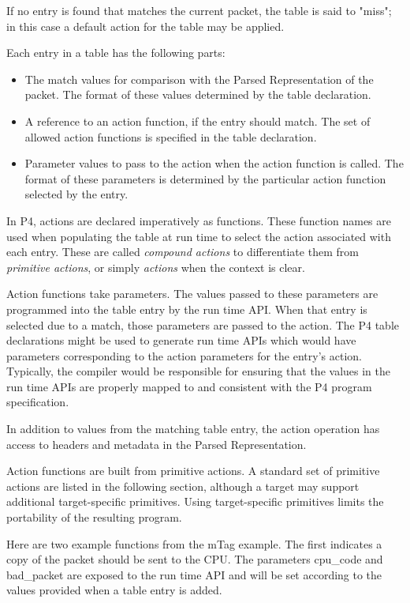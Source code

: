 \documentclass[12pt]{article}
\begin{document}
If no entry is found that matches the current packet, the table is said to 
"miss"; in this case a default action for the table may be applied.

Each entry in a \matchaction table has the following parts: 

\begin{itemize}
\item
The match values for comparison with the Parsed Representation of the packet. 
The format of these values determined by the table declaration.
\item
A reference to an action function, if the entry should match. The set
of allowed action functions is specified in the table declaration.
\item
Parameter values to pass to the action when the action function is called. 
The format of these parameters is determined by the particular action function 
selected by the entry.
\end{itemize}


In P4, actions are declared imperatively as functions. These function
names are used when populating the table at run time to select the
action associated with each entry. These are called \textit{compound
actions} to differentiate them from \textit{primitive actions}, or
simply \textit{actions} when the context is clear.

Action functions take parameters. The values passed to these
parameters are programmed into the table entry by the run time
API. When that entry is selected due to a match, those parameters are
passed to the action. The P4 table declarations might be used to
generate run time APIs which would have parameters corresponding to
the action parameters for the entry's action.  Typically, the compiler
would be responsible for ensuring that the values in the run time APIs
are properly mapped to and consistent with the P4 program
specification.

In addition to values from the matching table entry, the action operation 
has access to headers and metadata in the Parsed Representation.

Action functions are built from primitive actions. A standard set of
primitive actions are listed in the following section, although a
target may support additional target-specific primitives. Using
target-specific primitives limits the portability of the resulting
program.

Here are two example functions from the mTag example.  The first indicates 
a copy of the packet should be sent to the CPU.  The parameters cpu_code 
and bad_packet are exposed to the run time API and will be set according 
to the values provided when a table entry is added.
\end{document}

